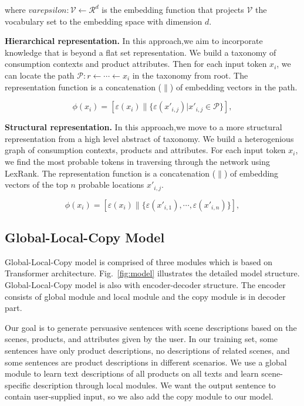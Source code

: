 \documentclass[sigconf]{acmart}
\begin{document}
where $varepsilon: \mathcal{V} \leftarrow \mathcal{R}^d$ is the embedding function that projects $\mathcal{V}$ the vocabulary set to the embedding space with dimension $d$. 


\textbf{Hierarchical representation.} In this approach,we aim to incorporate knowledge that is beyond a flat set representation. 
We build a taxonomy of consumption contexts and product attributes. 
Then for each input token $x_i$, we can locate the path $\mathcal{P}:r\leftarrow\cdots\leftarrow x_i $ in the taxonomy from root.
The representation function is a concatenation ($\|$) of embedding vectors in the path.

\begin{equation}
\phi(x_i) = [\varepsilon (x_i)\|\{\varepsilon(x'_{i,j})|x'_{i,j}\in \mathcal{P}\}],
\end{equation}

\textbf{Structural representation.} In this approach,we move to a more structural representation from a high level abstract of taxonomy. 
We build a heterogenious graph of consumption contexts, products and attributes. 
For each input token $x_i$, we find the most probable tokens in traversing through the network using LexRank.
The representation function is a concatenation ($\|$) of embedding vectors of the top $n$ probable locations $x'_{i,j}$.

\begin{equation}
\phi(x_i) = [\varepsilon (x_i)\|\{\varepsilon(x'_{i,1}),\cdots,\varepsilon(x'_{i,n})\}],
\end{equation}

\subsection{Global-Local-Copy Model}\label{sec:global}
Global-Local-Copy model is comprised of three modules which is based on Transformer architecture. Fig.~\ref{fig:model} illustrates the detailed model structure. Global-Local-Copy model is also with encoder-decoder structure. The encoder consists of global module and local module and the copy module is in decoder part. 

Our goal is to generate persuasive sentences with scene descriptions based on the scenes, products, and attributes given by the user. In our training set, some sentences have only product descriptions, no descriptions of related scenes, and some sentences are product descriptions in different scenarios. We use a global module to learn text descriptions of all products on all texts and learn scene-specific description through local modules. We want the output sentence to contain user-supplied input, so we also add the copy module to our model.
\end{document}

